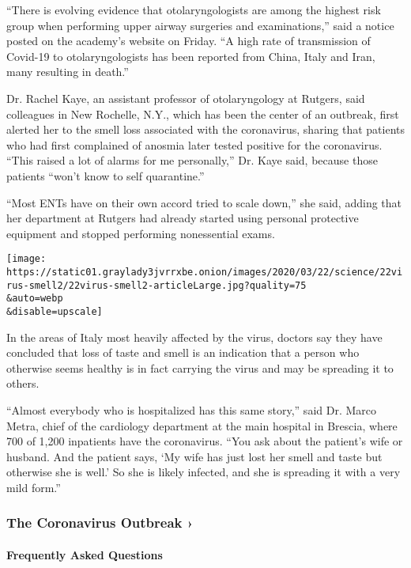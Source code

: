 ``There is evolving evidence that otolaryngologists are among the
highest risk group when performing upper airway surgeries and
examinations,'' said a notice posted on the academy's website on Friday.
``A high rate of transmission of Covid-19 to otolaryngologists has been
reported from China, Italy and Iran, many resulting in death.''

Dr. Rachel Kaye, an assistant professor of otolaryngology at Rutgers,
said colleagues in New Rochelle, N.Y., which has been the center of an
outbreak, first alerted her to the smell loss associated with the
coronavirus, sharing that patients who had first complained of anosmia
later tested positive for the coronavirus. ``This raised a lot of alarms
for me personally,'' Dr. Kaye said, because those patients ``won't know
to self quarantine.''

``Most ENTs have on their own accord tried to scale down,'' she said,
adding that her department at Rutgers had already started using personal
protective equipment and stopped performing nonessential exams.

\texttt{[image: https://static01.graylady3jvrrxbe.onion/images/2020/03/22/science/22virus-smell2/22virus-smell2-articleLarge.jpg?quality=75\\\&auto=webp\\\&disable=upscale]}

In the areas of Italy most heavily affected by the virus, doctors say
they have concluded that loss of taste and smell is an indication that a
person who otherwise seems healthy is in fact carrying the virus and may
be spreading it to others.

``Almost everybody who is hospitalized has this same story,'' said Dr.
Marco Metra, chief of the cardiology department at the main hospital in
Brescia, where 700 of 1,200 inpatients have the coronavirus. ``You ask
about the patient's wife or husband. And the patient says, `My wife has
just lost her smell and taste but otherwise she is well.' So she is
likely infected, and she is spreading it with a very mild form.''

\href{https://www.nytimes3xbfgragh.onion/news-event/coronavirus?action=click\&pgtype=Article\&state=default\&region=MAIN_CONTENT_3\&context=storylines_faq}{}

\hypertarget{the-coronavirus-outbreak-}{%
\subsubsection{The Coronavirus Outbreak
›}\label{the-coronavirus-outbreak-}}

\hypertarget{frequently-asked-questions}{%
\paragraph{Frequently Asked
Questions}\label{frequently-asked-questions}}

